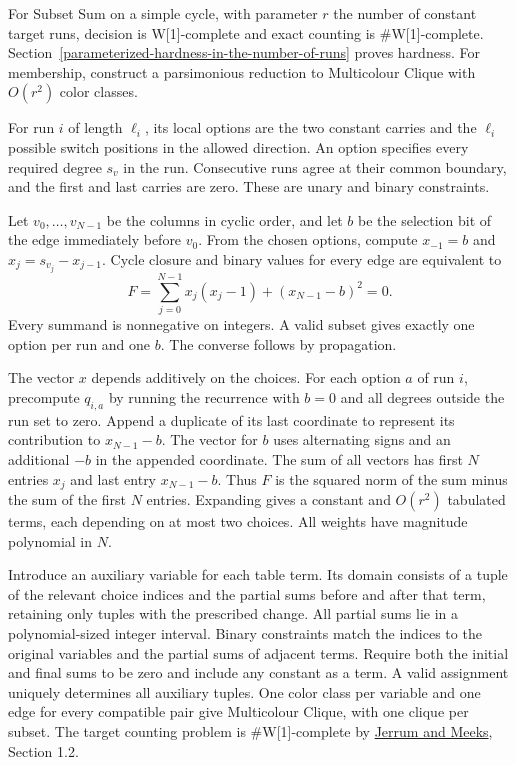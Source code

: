 \documentclass[11pt,a4paper]{article}
\numberwithin{equation}{section}
\begin{document}
For Subset Sum on a simple cycle, with parameter \(r\) the number of constant target runs, decision is W{[}1{]}-complete and exact counting is \#W{[}1{]}-complete. Section~\ref{parameterized-hardness-in-the-number-of-runs} proves hardness. For membership, construct a parsimonious reduction to Multicolour Clique with \(O(r^2)\) color classes.

For run \(i\) of length \(\ell_i\), its local options are the two constant carries and the \(\ell_i\) possible switch positions in the allowed direction. An option specifies every required degree \(s_v\) in the run. Consecutive runs agree at their common boundary, and the first and last carries are zero. These are unary and binary constraints.

Let \(v_0,\ldots,v_{N-1}\) be the columns in cyclic order, and let \(b\) be the selection bit of the edge immediately before \(v_0\). From the chosen options, compute \(x_{-1}=b\) and \(x_j=s_{v_j}-x_{j-1}\). Cycle closure and binary values for every edge are equivalent to
\begin{equation}\label{eq:cycle-penalty}
F=\sum_{j=0}^{N-1}x_j(x_j-1)+(x_{N-1}-b)^2=0.
\end{equation}
Every summand is nonnegative on integers. A valid subset gives exactly one option per run and one \(b\). The converse follows by propagation.

The vector \(x\) depends additively on the choices. For each option \(a\) of run \(i\), precompute \(q_{i,a}\) by running the recurrence with \(b=0\) and all degrees outside the run set to zero. Append a duplicate of its last coordinate to represent its contribution to \(x_{N-1}-b\). The vector for \(b\) uses alternating signs and an additional \(-b\) in the appended coordinate. The sum of all vectors has first \(N\) entries \(x_j\) and last entry \(x_{N-1}-b\). Thus \(F\) is the squared norm of the sum minus the sum of the first \(N\) entries. Expanding gives a constant and \(O(r^2)\) tabulated terms, each depending on at most two choices. All weights have magnitude polynomial in \(N\).

Introduce an auxiliary variable for each table term. Its domain consists of a tuple of the relevant choice indices and the partial sums before and after that term, retaining only tuples with the prescribed change. All partial sums lie in a polynomial-sized integer interval. Binary constraints match the indices to the original variables and the partial sums of adjacent terms. Require both the initial and final sums to be zero and include any constant as a term. A valid assignment uniquely determines all auxiliary tuples. One color class per variable and one edge for every compatible pair give Multicolour Clique, with one clique per subset. The target counting problem is \#W{[}1{]}-complete by \href{https://eprints.gla.ac.uk/97129/1/97129.pdf}{Jerrum and Meeks}, Section 1.2.
\end{document}
